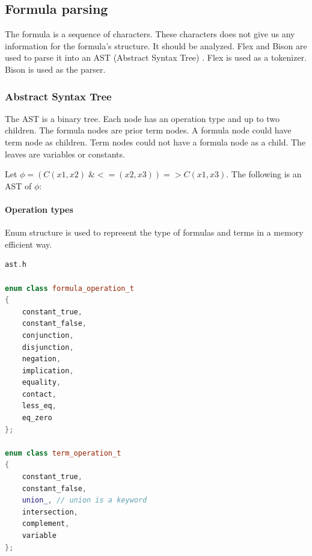 \documentclass{article}
\begin{document}
	\subsection{Formula parsing}
	The formula is a sequence of characters. These characters does not give us any information for the formula's structure. It should be analyzed. Flex \cite{flex-tokenizer} and Bison \cite{bison-parser} are used to parse it into an AST (Abstract Syntax Tree) \cite{AST}. Flex is used as a tokenizer. Bison is used as the parser.

	\subsubsection{Abstract Syntax Tree}
	The AST is a binary tree. Each node has an operation type and up to two children. The formula nodes are prior term nodes. A formula node could have term node as children. Term nodes could not have a formula node as a child. The leaves are variables or constants.
	
	Let $\phi = (C(x1,x2) \;\& <=(x2, x3)) => C(x1, x3)$. The following is an AST of $\phi$:


	\newpage
	\paragraph{Operation types} Enum structure is used to represent the type of formulas and terms in a memory efficient way.

\begin{lstlisting}[language=C++]
ast.h

enum class formula_operation_t
{
    constant_true,
    constant_false,
    conjunction,
    disjunction,
    negation,
    implication,
    equality,
    contact,
    less_eq,
    eq_zero
};

enum class term_operation_t
{
    constant_true,
    constant_false,
    union_, // union is a keyword
    intersection,
    complement,
    variable
};
\end{lstlisting}
\end{document}

